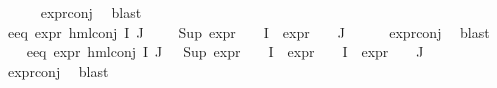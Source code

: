 \begin{isabellebody}
\ \ \ \ \isamarkupfalse%
\ expr{\isacharunderscore}{\kern0pt}{}{\isacharunderscore}{\kern0pt}conj\ \isamarkupfalse%
\ blast\isanewline
\ \ \isamarkupfalse%
\ e{}{\isacharunderscore}{\kern0pt}eq{\isacharcolon}{\kern0pt}\ {\isachardoublequoteopen}expr{\isacharunderscore}{\kern0pt}{}\ {\isacharparenleft}{\kern0pt}hml{\isacharunderscore}{\kern0pt}conj\ I\ J\ {\isasymPhi}{\isacharparenright}{\kern0pt}\ {\isacharequal}{\kern0pt}\ {}\ {\isacharplus}{\kern0pt}\ Sup\ {\isacharparenleft}{\kern0pt}{\isacharparenleft}{\kern0pt}expr{\isacharunderscore}{\kern0pt}{}\ {\isasymcirc}\ {\isasymPhi}{\isacharparenright}{\kern0pt}\ {\isacharbackquote}{\kern0pt}\ I\ {\isasymunion}\ {\isacharparenleft}{\kern0pt}expr{\isacharunderscore}{\kern0pt}{}\ {\isasymcirc}\ {\isasymPhi}{\isacharparenright}{\kern0pt}\ {\isacharbackquote}{\kern0pt}\ J{\isacharparenright}{\kern0pt}{\isachardoublequoteclose}\isanewline
\ \ \ \ \isamarkupfalse%
\ expr{\isacharunderscore}{\kern0pt}{}{\isacharunderscore}{\kern0pt}conj\ \isamarkupfalse%
\ blast\isanewline
\ \ \isamarkupfalse%
\ e{}{\isacharunderscore}{\kern0pt}eq{\isacharcolon}{\kern0pt}\ {\isachardoublequoteopen}expr{\isacharunderscore}{\kern0pt}{}\ {\isacharparenleft}{\kern0pt}hml{\isacharunderscore}{\kern0pt}conj\ I\ J\ {\isasymPhi}{\isacharparenright}{\kern0pt}\ {\isacharequal}{\kern0pt}\ {\isacharparenleft}{\kern0pt}Sup\ {\isacharparenleft}{\kern0pt}{\isacharparenleft}{\kern0pt}expr{\isacharunderscore}{\kern0pt}{}\ {\isasymcirc}\ {\isasymPhi}{\isacharparenright}{\kern0pt}\ {\isacharbackquote}{\kern0pt}\ I\ {\isasymunion}\ {\isacharparenleft}{\kern0pt}expr{\isacharunderscore}{\kern0pt}{}\ {\isasymcirc}\ {\isasymPhi}{\isacharparenright}{\kern0pt}\ {\isacharbackquote}{\kern0pt}\ I\ {\isasymunion}\ {\isacharparenleft}{\kern0pt}expr{\isacharunderscore}{\kern0pt}{}\ {\isasymcirc}\ {\isasymPhi}{\isacharparenright}{\kern0pt}\ {\isacharbackquote}{\kern0pt}\ J{\isacharparenright}{\kern0pt}{\isacharparenright}{\kern0pt}{\isachardoublequoteclose}\isanewline
\ \ \ \ \isamarkupfalse%
\ expr{\isacharunderscore}{\kern0pt}{}{\isacharunderscore}{\kern0pt}conj\ \isamarkupfalse%
\ blast\isanewline
\ \ \isamarkupfalse%

\end{isabellebody}
